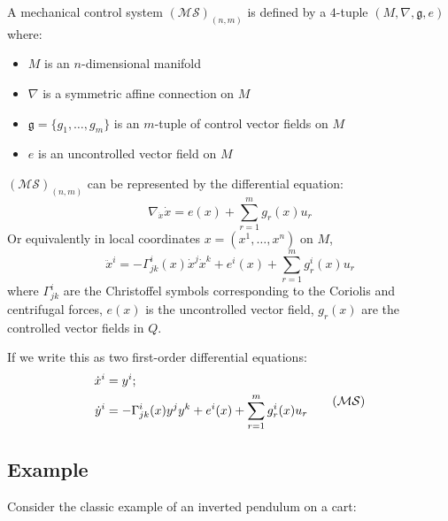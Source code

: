 \begin{defn}
    A mechanical control system $(\mathcal{MS})_{(n,m)}$ is defined by a $4$-tuple $(M, \nabla, \mathfrak{g}, e)$ where:
    \begin{itemize}
        \item $M$ is an $n$-dimensional manifold
        \item $\nabla$ is a symmetric affine connection on $M$
        \item $\mathfrak{g} = \{g_1, \dots, g_m\}$ is an $m$-tuple of control vector fields on $M$
        \item $e$ is an uncontrolled vector field on $M$
    \end{itemize}
    $(\mathcal{MS})_{(n,m)}$ can be represented by the differential equation:
    \begin{equation}
        \nabla_{\dot{x}} \dot{x} = e(x) + \sum_{r=1}^m g_r(x) u_r 
    \end{equation}
    Or equivalently in local coordinates $x = (x^1, \dots, x^n)$ on $M$, 
    \begin{equation}\label{SODE-initial}
        \ddot{x}^i = - \Gamma ^i_{jk}(x)\dot{x}^j \dot{x}^k + e^i(x) + \sum_{r=1}^m g^i_r(x)u_r
    \end{equation}
    where $\Gamma^i_{jk}$ are the Christoffel symbols corresponding to the Coriolis and centrifugal forces, $e(x)$ is the uncontrolled vector field, $g_r(x)$ are the controlled vector fields in $Q$.

    If we write this as two first-order differential equations:
    \begin{equation}\label{SODE-nonlinear}
        \begin{split}
            \dot{x}^i  &= y^i; \\
            \dot{y}^i  &= - \Gamma^i_{jk}(x)y^jy^k + e^i(x) + \sum_{r=1}^m g_r^i(x)u_r
        \end{split} \tag{$\mathcal{MS}$} 
    \end{equation}
\end{defn}

\newpage

\subsection{Example}

Consider the classic example of an inverted pendulum on a cart:

